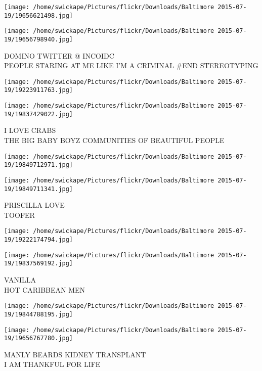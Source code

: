 \documentclass[10pt,letterpaper]{article}
\begin{document}
\texttt{[image: /home/swickape/Pictures/flickr/Downloads/Baltimore 2015-07-19/19656621498.jpg]}

\vspace{0.25in}
\texttt{[image: /home/swickape/Pictures/flickr/Downloads/Baltimore 2015-07-19/19656798940.jpg]}

DOMINO TWITTER @ INCOIDC\\
PEOPLE STARING AT ME LIKE I'M A CRIMINAL \#END STEREOTYPING\\
\pagebreak

\texttt{[image: /home/swickape/Pictures/flickr/Downloads/Baltimore 2015-07-19/19223911763.jpg]}

\vspace{0.25in}
\texttt{[image: /home/swickape/Pictures/flickr/Downloads/Baltimore 2015-07-19/19837429022.jpg]}

I LOVE CRABS\\
THE BIG BABY BOYZ COMMUNITIES OF BEAUTIFUL PEOPLE\\
\pagebreak

\texttt{[image: /home/swickape/Pictures/flickr/Downloads/Baltimore 2015-07-19/19849712971.jpg]}

\vspace{0.25in}
\texttt{[image: /home/swickape/Pictures/flickr/Downloads/Baltimore 2015-07-19/19849711341.jpg]}

PRISCILLA LOVE\\
TOOFER\\
\pagebreak

\texttt{[image: /home/swickape/Pictures/flickr/Downloads/Baltimore 2015-07-19/19222174794.jpg]}

\vspace{0.25in}
\texttt{[image: /home/swickape/Pictures/flickr/Downloads/Baltimore 2015-07-19/19837569192.jpg]}

VANILLA\\
HOT CARIBBEAN MEN\\
\pagebreak

\texttt{[image: /home/swickape/Pictures/flickr/Downloads/Baltimore 2015-07-19/19844788195.jpg]}

\vspace{0.25in}
\texttt{[image: /home/swickape/Pictures/flickr/Downloads/Baltimore 2015-07-19/19656767780.jpg]}

MANLY BEARDS KIDNEY TRANSPLANT\\
I AM THANKFUL FOR LIFE\\
\pagebreak
\end{document}

